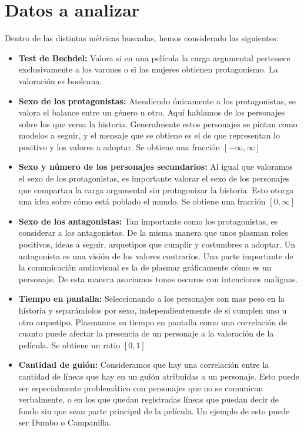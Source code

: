 \section{Datos a analizar}
    Dentro de las distintas métricas buscadas, hemos considerado las siguientes:
    \begin{itemize}
        \item \textbf{Test de Bechdel:} Valora si en una película la carga argumental pertenece exclusivamente a los varones o si las mujeres obtienen protagonismo. La valoración es booleana.
        \item \textbf{Sexo de los protagonistas:} Atendiendo únicamente a los protagonistas, se valora el balance entre un género u otro. Aquí hablamos de los personajes sobre los que versa la historia. Generalmente estos personajes se pintan como modelos a seguir, y el mensaje que se obtiene es el de que representan lo positivo y los valores a adoptar. Se obtiene una fracción $[-\infty,\infty]$
        \item \textbf{Sexo y número de los personajes secundarios:} Al igual que valoramos el sexo de los protagonistas, es importante valorar el sexo de los personajes que compartan la carga argumental sin protagonizar la historia. Esto otorga una idea sobre cómo está poblado el mundo. Se obtiene una fracción $[0,\infty]$
        \item \textbf{Sexo de los antagonistas:} Tan importante como los protagonistas, es considerar a los antagonistas. De la misma manera que unos plasman roles positivos, ideas a seguir, arquetipos que cumplir y costumbres a adoptar. Un antagonista es una visión de los valores contrarios. Una parte importante de la comunicación audiovisual es la de plasmar gráficamente cómo es un personaje. De esta manera asociamos tonos oscuros con intenciones malignas.
        \item \textbf{Tiempo en pantalla:} Seleccionando a los personajes con mas peso en la historia y separándolos por sexo, independientemente de si cumplen uno u otro arquetipo. Plasmamos su tiempo en pantalla como una correlación de cuanto puede afectar la presencia de un personaje a la valoración de la película. Se obtiene un ratio $[0,1]$
        \item \textbf{Cantidad de guión:} Consideramos que hay una correlación entre la cantidad de líneas que hay en un guión atribuidas a un personaje. Esto puede ser especialmente problemático con personajes que no se comunican verbalmente, o en los que quedan registradas líneas que puedan decir de fondo sin que sean parte principal de la película. Un ejemplo de esto puede ser Dumbo o Campanilla.

\end{itemize}
